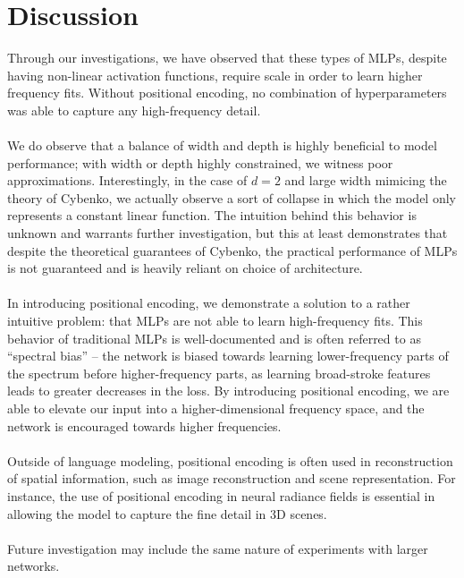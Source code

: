 \documentclass[11pt]{article}
\begin{document}
\section{Discussion}
Through our investigations, we have observed that these types of MLPs, despite having non-linear activation functions, require scale in order to learn higher frequency fits. Without positional encoding, no combination of hyperparameters was able to capture any high-frequency detail.
\\\\
We do observe that a balance of width and depth is highly beneficial to model performance; with width or depth highly constrained, we witness poor approximations. Interestingly, in the case of $d = 2$ and large width mimicing the theory of Cybenko, we actually observe a sort of collapse in which the model only represents a constant linear function. The intuition behind this behavior is unknown and warrants further investigation, but this at least demonstrates that despite the theoretical guarantees of Cybenko, the practical performance of MLPs is not guaranteed and is heavily reliant on choice of architecture.
\\\\
In introducing positional encoding, we demonstrate a solution to a rather intuitive problem: that MLPs are not able to learn high-frequency fits. This behavior of traditional MLPs is well-documented and is often referred to as ``spectral bias'' \cite{rahaman2019spectral} -- the network is biased towards learning lower-frequency parts of the spectrum before higher-frequency parts, as learning broad-stroke features leads to greater decreases in the loss. By introducing positional encoding, we are able to elevate our input into a higher-dimensional frequency space, and the network is encouraged towards higher frequencies.
\\\\
Outside of language modeling, positional encoding is often used in reconstruction of spatial information, such as image reconstruction \cite{tancik2020fourier} and scene representation. For instance, the use of positional encoding in neural radiance fields \cite{mildenhall2020nerf} is essential in allowing the model to capture the fine detail in 3D scenes.
\\\\
Future investigation may include the same nature of experiments with larger networks.


\pagebreak



\end{document}
